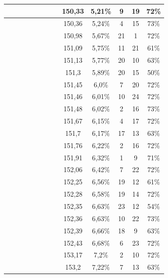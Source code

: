 \begin{center}
\begin{longtable}{|c|c|c|c|c|c|c|c|c|c|c|c|c|}
 \x &  \x &  \x &  \x &  &  \x &  &  \x & 150,33 & 5,21\% & 9 & 19 & 72\% \\ \hline
 \x &  \x &  &  &  &  \x &  \x &  \x & 150,36 & 5,24\% & 4 & 15 & 73\% \\ \hline
 \x &  \x &  &  &  &  \x &  &  \x & 150,98 & 5,67\% & 21 & 1 & 72\% \\ \hline
 \x &  &  &  &  \x &  &  &  \x & 151,09 & 5,75\% & 11 & 21 & 61\% \\ \hline
 \x &  &  \x &  \x &  &  &  &  \x & 151,13 & 5,77\% & 20 & 10 & 63\% \\ \hline
 \x &  &  &  \x &  &  &  &  \x & 151,3 & 5,89\% & 20 & 15 & 50\% \\ \hline
 \x &  \x &  &  \x &  &  \x &  &  \x & 151,45 & 6,0\% & 7 & 20 & 72\% \\ \hline
 \x &  \x &  \x &  \x &  \x &  \x &  &  \x & 151,46 & 6,01\% & 10 & 24 & 72\% \\ \hline
 \x &  \x &  &  &  \x &  \x &  \x &  \x & 151,48 & 6,02\% & 2 & 16 & 73\% \\ \hline
 \x &  \x &  &  \x &  \x &  \x &  \x &  \x & 151,67 & 6,15\% & 4 & 17 & 72\% \\ \hline
 \x &  &  \x &  \x &  &  &  &  \x & 151,7 & 6,17\% & 17 & 13 & 63\% \\ \hline
 \x &  &  \x &  \x &  \x &  \x &  \x &  \x & 151,76 & 6,22\% & 2 & 16 & 72\% \\ \hline
 \x &  &  \x &  \x &  \x &  \x &  &  \x & 151,91 & 6,32\% & 1 & 9 & 71\% \\ \hline
 \x &  &  \x &  \x &  &  \x &  \x &  \x & 152,06 & 6,42\% & 7 & 22 & 72\% \\ \hline
 \x &  \x &  &  &  \x &  &  &  \x & 152,25 & 6,56\% & 19 & 12 & 61\% \\ \hline
 \x &  &  &  &  \x &  \x &  &  \x & 152,28 & 6,58\% & 19 & 14 & 72\% \\ \hline
 \x &  \x &  &  \x &  &  &  &  \x & 152,35 & 6,63\% & 23 & 12 & 54\% \\ \hline
 \x &  \x &  &  &  &  \x &  \x &  \x & 152,36 & 6,63\% & 10 & 22 & 73\% \\ \hline
 \x &  \x &  \x &  \x &  \x &  &  \x &  \x & 152,39 & 6,66\% & 18 & 9 & 63\% \\ \hline
 \x &  &  &  \x &  \x &  \x &  &  \x & 152,43 & 6,68\% & 6 & 23 & 72\% \\ \hline
 \x &  \x &  &  &  \x &  \x &  &  \x & 153,17 & 7,2\% & 2 & 10 & 72\% \\ \hline
 \x &  \x &  \x &  &  &  &  \x &  \x & 153,2 & 7,22\% & 7 & 13 & 63\% \\ \hline

\end{longtable}
\end{center}

